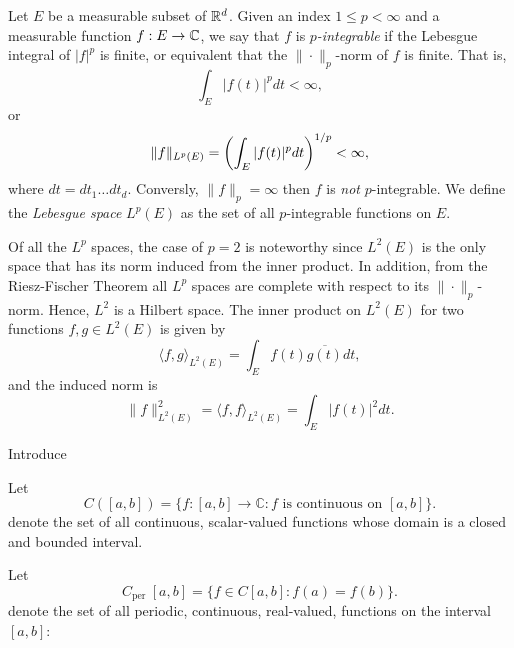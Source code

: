 \documentclass[../thesis.tex]{subfiles}
\begin{document}
\begin{definition}
    Let $E$ be a measurable subset of $\mathbb{R}^d$. Given an index $1 \leq p < \infty$ and a measurable function $f:E\rightarrow \mathbb{C}$, we say that $f$ is \emph{$p$-integrable} if the Lebesgue integral of $|f|^p$ is finite, or equivalent that the $\|\cdot\|_p$-norm of $f$ is finite. That is,
    \begin{equation*}
        \int_{E} |f(t)|^p dt < \infty,
    \end{equation*}
    or 
    \begin{equation*}
        \|f\|_{L^p(E)} = \left(\int_{E} |f(t)|^p dt\right)^{1/p}< \infty,
    \end{equation*}
    where $dt= dt_1 \dots dt_d$. Conversly, $\|f\|_p = \infty$ then $f$ is \emph{not} $p$-integrable. We define the \emph{Lebesgue space} $L^p(E)$ as the set of all $p$-integrable functions on $E$. %
\end{definition}

Of all the $L^p$ spaces, the case of $p=2$ is noteworthy since $L^2(E)$ is the only space that has its norm induced from the inner product.
In addition, from the Riesz-Fischer Theorem \cite[p.~279]{heilIntroductionRealAnalysis2019} all $L^p$ spaces are complete with respect to its $\|\cdot\|_p$-norm. Hence, $L^2$ is a Hilbert space. The inner product on $L^2(E)$ for two functions $f,g\in L^2(E)$ is given by
\begin{equation}
    \langle f, g\rangle_{L^2(E)} = \int_{E} f(t)\overline{g(t)} dt,
\end{equation}
and the induced norm is 
\begin{equation}
    \|f\|_{L^2(E)}^2 = \langle f, f\rangle_{L^2(E)} = \int_{E} |f(t)|^2 dt.
\end{equation}




Introduce

Let
\begin{equation}
    C([a,b]) = \{f:[a,b] \rightarrow \mathbb{C}: f \text{ is continuous on } [a,b]\}.
\end{equation}
denote the set of all continuous, scalar-valued functions whose domain is a closed and bounded interval.


Let
\begin{equation*}
C_{\text {per }}[a,b]=\{f \in C[a,b]: f(a)=f(b)\}.
\end{equation*}
denote the set of all periodic, continuous, real-valued, functions on the interval $[a,b]$:
\end{document}
